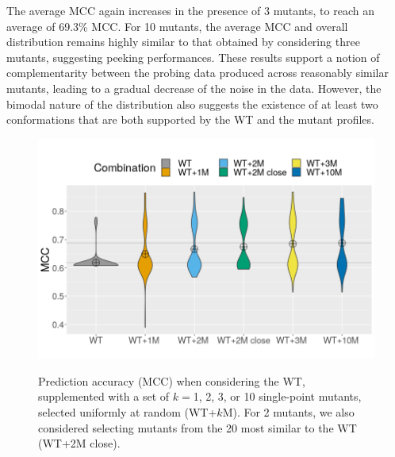 \documentclass[a4,center,fleqn]{NAR}
\begin{document}
The average MCC again increases in the presence of 3 mutants, to reach an average of 69.3\% MCC. For 10 mutants, the average MCC and overall distribution remains highly similar to that obtained by considering three mutants, suggesting peeking performances. These results support a notion of complementarity between the probing data produced across reasonably similar mutants, leading to a gradual decrease of the noise in the data. However, the bimodal nature of the distribution also suggests the existence of at least two conformations that are both supported by the WT and the mutant profiles.


\begin{figure}
	{\centering
		\includegraphics[width=\linewidth]{graphs/combinationscale.png}\\}
		
	\caption{Prediction accuracy (MCC) when considering the WT, supplemented with a set of $k=$1, 2, 3, or 10 single-point mutants, selected uniformly at random ({\sf WT+$k$M}). For 2 mutants, we also considered selecting mutants from the 20 most similar to the WT ({\sf WT+2M close}).}\label{fig:variantanalysis}
\end{figure}



\end{document}
